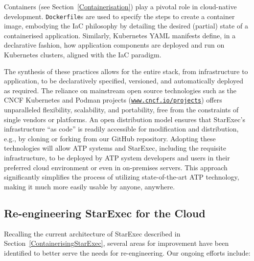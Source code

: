 \documentclass{easychair}
\begin{document}
Containers (see Section~\ref{Containerisation}) play a pivotal role in cloud-native development. 
{\tt Dockerfile}s are used to specify the steps to create a container image, embodying the IaC 
philosophy by detailing the desired (partial) state of a containerised application. 
Similarly, Kubernetes YAML manifests define, in a declarative fashion, how application components 
are deployed and run on Kubernetes clusters, aligned with the IaC paradigm.

The synthesis of these practices allows for the entire stack, from infrastructure to application, 
to be declaratively specified, versioned, and automatically deployed as required. 
The reliance on mainstream open source technologies such as the CNCF Kubernetes and Podman
projects (\href{https://www.cncf.io/projects/}{\tt www.cncf.io/projects}) offers unparalleled 
flexibility, scalability, and portability, free from the constraints of single vendors or 
platforms.
An open distribution model ensures that StarExec's infrastructure ``as code'' is readily 
accessible for modification and distribution, e.g., by cloning or forking from our GitHub 
repository.
Adopting these technologies will allow ATP systems and StarExec, including the requisite 
infrastructure, to be deployed by ATP system developers and users in 
their preferred cloud environment or even in on-premises servers. 
This approach significantly simplifies the process of utilizing state-of-the-art ATP technology, 
making it much more easily usable by anyone, anywhere.

\subsection{Re-engineering StarExec for the Cloud}
\label{FutureStarExec}

Recalling the current architecture of StarExec described in Section~\ref{ContainerisingStarExec}, 
several areas for improvement have been identified to better serve the needs for re-engineering. 
Our ongoing efforts include:
\end{document}
